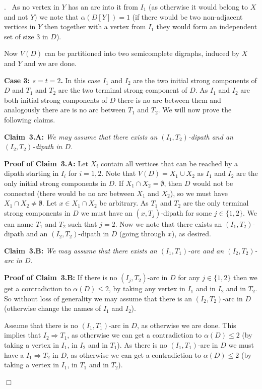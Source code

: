 \documentclass{article}
\newcommand{\2}{\vspace{2mm}}
\renewenvironment{proof}[1][]{\par \noindent {\bf Proof#1}.\ }{\hfill$\Box$
\par \vspace{11pt}}
\theoremstyle{definition}
\begin{document}
\begin{proof}
As no vertex in $Y$ has an arc into it from $I_1$ (as otherwise it would belong to $X$ and not $Y$) we note that
$\alpha(D[Y])=1$ (if there would be two non-adjacent vertices in $Y$
then together with a vertex from $I_1$ they would form an independent set of size 3 in $D$).

Now $V(D)$ can be partitioned into two semicomplete digraphs, induced by $X$ and $Y$ and we are done.

\2

{\bf Case 3: $s=t=2$.}
In this case $I_1$ and $I_2$ are the two initial strong components of $D$ and $T_1$ and $T_2$ are the two terminal strong component of $D$.
As $I_1$ and $I_2$ are both initial strong components of $D$ there is no arc between them and
analogously there are is no arc between $T_1$ and $T_2$.
We will now prove the following claims.

\2

{\bf Claim~3.A:} {\em We may assume that there exists an $(I_1,T_2)$-dipath and an $(I_2,T_2)$-dipath in $D$.}

\2

{\bf Proof of Claim~3.A:} Let $X_i$ contain all vertices that can be reached by a dipath starting in $I_i$ for $i=1,2$.
Note that $V(D) = X_1 \cup X_2$ as $I_1$ and $I_2$ are the only initial strong components in $D$.
If $X_1 \cap X_2 = \emptyset$, then $D$ would not be connected (there would be no arc between $X_1$ and $X_2$),
so we must have $X_1 \cap X_2 \not= \emptyset$. Let $x \in X_1 \cap X_2$ be arbitrary. 
As $T_1$ and $T_2$ are the only terminal strong components in $D$ we must have an $(x,T_j)$-dipath for some $j \in \{1,2\}$.
We can name $T_1$ and $T_2$ such that $j=2$. Now we note that there exists an $(I_1,T_2)$-dipath and an $(I_2,T_2)$-dipath in $D$ 
(going through $x$), as desired.

\2

{\bf Claim~3.B:} {\em We may assume that there exists an $(I_1,T_1)$-arc and an $(I_2,T_2)$-arc in $D$.}

\2

{\bf Proof of Claim~3.B:} If there is no $(I_j,T_2)$-arc in $D$ for any $j \in \{1,2\}$ then we get a contradiction 
to $\alpha(D) \leq 2$, by taking any vertex in $I_1$ and in $I_2$ and in $T_2$. So without loss of generality 
we may assume that there is an $(I_2,T_2)$-arc in $D$ (otherwise change the names of $I_1$ and $I_2$).

Assume that there is no $(I_1,T_1)$-arc in $D$, as otherwise we are done. This implies that $I_2 \Rightarrow T_1$, 
as otherwise we can get a contradiction  to $\alpha(D) \leq 2$ (by taking a vertex in $I_1$, in $I_2$ and in $T_1$).
As there is no $(I_1,T_1)$-arc in $D$ we must have a $I_1 \Rightarrow T_2$ in $D$, as otherwise
we can get a contradiction  to $\alpha(D) \leq 2$ (by taking a vertex in $I_1$, in $T_1$ and in $T_2$). 


\end{proof}
\end{document}
